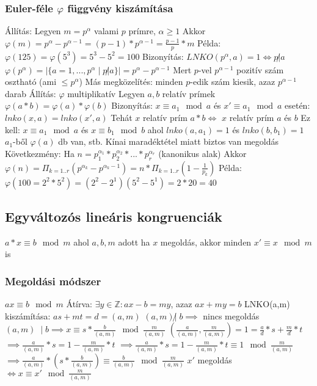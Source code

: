 \documentclass[12pt,a4paper]{article}
\begin{document}
\pagebreak

\subsubsection{Euler-féle $\varphi$ függvény kiszámítása}

\begin{outline}
	\1 Állítás:
		\2 Legyen $m=p^\alpha$ valami $p$ prímre, $\alpha \ge 1$
		\2 Akkor $\varphi(m) = p^\alpha - p^{\alpha-1} = (p-1)*p^{\alpha-1} = \frac{p-1}{p}*m$
		\2 Példa: $\varphi(125)=\varphi(5^3)=5^3-5^2=100$
	\1 Bizonyítás:
		\2 $LNKO(p^\alpha,a)=1 \Leftrightarrow p \not | a$
		\2 $\varphi(p^\alpha)=|\{a=1,...,p^\alpha \;|\; p \not | a\}|=p^\alpha - p^{\alpha-1}$
			\3 Mert $p$-vel $p^{\alpha-1}$ pozitív szám osztható (ami $\le p^\alpha$)
			\3 Más megközelítés: minden $p$-edik szám kiesik, azaz $p^{\alpha-1}$ darab
	\1 Állítás: $\varphi$ multiplikatív
		\2 Legyen $a,b$ relatív prímek
		\2 $\varphi(a*b)=\varphi(a)*\varphi(b)$
	\1 Bizonyítás:
		\2 $x \equiv a_1 \mod a$ és $x' \equiv a_1 \mod a$ esetén: $lnko(x,a)=lnko(x',a)$
		\2 Tehát $x$ relatív prím $a*b \Leftrightarrow$ $x$ relatív prím $a$ és $b$
		\2 Ez kell: $x \equiv a_1 \mod a$ és $x \equiv b_1 \mod b$
			\3 ahol $lnko(a,a_1)=1$ és $lnko(b,b_1)=1$
		\2 $a_1$-ből $\varphi(a)$ db van, stb.
		\2 Kínai maradéktétel miatt biztos van megoldás
	\1 Következmény:
		\2 Ha $n=p_1^{\alpha_1}*p_2^{\alpha_2}*...*p_r^{\alpha_r}$ (kanonikus alak)
		\2 Akkor $\varphi(n)=\Pi_{k=1..r}(p^{\alpha_k}-p^{\alpha_k-1})=n*\Pi_{k=1..r}(1-\frac{1}{p_k})$
		\2 Példa: $\varphi(100=2^2*5^2)=(2^2-2^1)(5^2-5^1)=2*20=40$
\end{outline}

\pagebreak

\subsection{Egyváltozós lineáris kongruenciák}

\begin{outline}
	\1 $a*x \equiv b \mod m$ ahol $a,b,m$ adott
	\1 ha $x$ megoldás, akkor minden $x' \equiv x \mod m$ is
\end{outline}

\subsubsection{Megoldási módszer}

\begin{outline}
	\1 $ax \equiv b \mod m$
	\1 Átírva: $\exists y \in \mathbb{Z}: ax-b=my$, azaz $ax+my=b$
	\1 LNKO(a,m) kiszámítása: $as+mt=d=(a,m)$
	\1 $(a,m) \not |\; b \implies$ nincs megoldás
	\1 $(a,m) \;\;|\; b \implies x \equiv s*\frac{b}{(a,m)} \mod \frac{m}{(a,m)}$
		\2 $(\frac{a}{(a,m)},\frac{m}{(a,m)})=1=\frac{a}{d}*s+ \frac{m}{d}*t$
		\2 $\implies \frac{a}{(a,m)}*s=1-\frac{m}{(a,m)}*t$
		\2 $\implies \frac{a}{(a,m)}*s=1-\frac{m}{(a,m)}*t \equiv 1 \mod \frac{m}{(a,m)}$
		\2 $\implies \frac{a}{(a,m)}*(s*\frac{b}{(a,m)}) \equiv \frac{b}{(a,m)} \mod \frac{m}{(a,m)}$
	\1 $x'$ megoldás $\Leftrightarrow x \equiv x' \mod \frac{m}{(a,m)}$
\end{outline}
\end{document}
